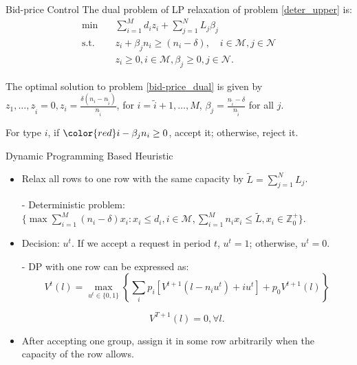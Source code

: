       \begin{frame}{Bid-price Control}
        The dual problem of LP relaxation of problem \eqref{deter_upper} is:
        \begin{equation}\label{bid-price_dual}
          \begin{aligned}
          \min \quad & \sum_{i=1}^{M} d_i z_i + \sum_{j= 1}^{N} L_j \beta_{j} \\
          \text {s.t.} \quad & z_{i} + \beta_j n_i \geq (n_i-\delta), \quad i \in \mathcal{M}, j \in \mathcal{N} \\
          & z_{i} \geq 0, i \in \mathcal{M}, \beta_{j} \geq 0, j \in \mathcal{N}.
          \end{aligned}
        \end{equation}
        
        \small
        
        The optimal solution to problem \eqref{bid-price_dual} is given by $z_1, \ldots, z_{\tilde{i}} =0, z_i = \frac{\delta (n_i - n_{\tilde{i}})}{n_{\tilde{i}}}$, for $i = \tilde{i} + 1, \ldots, M$, $\beta_j = \frac{n_{\tilde{i}} - \delta}{n_{\tilde{i}}}$ for all $j$.
        \vspace{0.5cm}

        For type $i$, if ${\color{red}i - \beta_j n_i} \geq 0$, accept it; otherwise, reject it.
      \end{frame}

      \begin{frame}{Dynamic Programming Based Heuristic}
        \begin{itemize}
        \item Relax all rows to one row with the same capacity by $\tilde{L} = \sum_{j=1}^{N} L_j$.
        \item[-] Deterministic problem: $\{\max \sum_{i=1}^{M} (n_i- \delta) x_{i}: x_{i} \leq d_{i}, i \in \mathcal{M}, \sum_{i=1}^{M} n_{i} x_{i} \leq \tilde{L}, x_{i} \in \mathbb{Z}^{+}_{0}\}$.
        \item Decision: $u^{t}$. If we accept a request in period $t$, $u^t = 1$; otherwise, $u^t =0$.  
        \item[-] {\color{red}DP with one row} can be expressed as:
        $$V^{t}(l) =  \max_{u^{t} \in \{0,1\}} \left\{ \sum_{i} p_i [V^{t+1}(l-n_i u^{t})+ i u^{t}] + p_0 V^{t+1}(l)\right\}$$

        $$V^{T+1}(l) =0, \forall l.$$
        \item After accepting one group, assign it in some row arbitrarily when the capacity of the row allows.
        \end{itemize}
      \end{frame}
      
